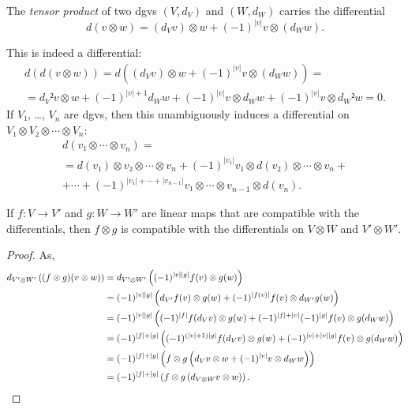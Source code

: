 \documentclass[english,no-theorem-numbers]{short-notes}
\newcommand\degree[1]{|#1|}
\newenvironment{verification}{\footnotesize\color{gray}}{}
\begin{document}
\begin{Def}
The \emph{tensor product} of two dgvs $(V,d_V)$ and $(W,d_W)$ carries the differential
\[
d(v\otimes w) = (d_V v) \otimes w + (-1)^{\degree v} v \otimes (d_W w).
\]
\end{Def}
\begin{verification}
    This is indeed a differential:
    \begin{multline*}
    d(d(v\otimes w)) =
    d\left((d_V v) \otimes w + (-1)^{\degree v} v \otimes (d_W w)\right)  =\\=
    d_V²v \otimes w + (-1)^{\degree v + 1} d_Ww + (-1)^{\degree v} v \otimes d_W w + (-1)^{\degree v} v \otimes d_W² w =
    0.
    \end{multline*}%
\end{verification}%
If $V₁$, \dots, $V_n$ are dgvs, then this unambiguously induces a differential on $V₁ \otimes V₂ \otimes \dotsb \otimes V_n$:
\begin{multline*}
d(v₁ \otimes \dotsb \otimes v_n) = \\ =
d(v₁) \otimes v₂ \otimes \dotsb \otimes v_n + (-1)^{\degree{v₁}} v₁ \otimes d(v₂) \otimes \dotsb \otimes v_n + \\ + \dotsb + (-1)^{\degree{v₁} + \dotsb + \degree{v_{n-1}}} v₁ \otimes \dotsb \otimes v_{n-1} \otimes d(v_n).
\end{multline*}

\begin{Prop}
    If $f\colon V → V'$ and $g\colon W → W'$ are linear maps that are compatible with the differentials, then $f \otimes g$ is compatible with the differentials on $V\otimes W$ and $V' \otimes W'$.
\end{Prop}
\begin{proof}
    As,
    \begin{align*}
    d_{V'\otimes W'}\left( (f\otimes g)(v \otimes w) \right)  & =
    d_{V'\otimes W'}\left( (-1)^{\degree v \degree g}f(v) \otimes g(w) \right) \\ & =
    (-1)^{\degree v \degree g} \left( d_{V'}f(v) \otimes g(w) + (-1)^{\degree{f(v)}} f(v) \otimes d_{W'} g(w) \right)\\ &  = 
    (-1)^{\degree v \degree g} \left( (-1)^{\degree f}f(d_Vv) \otimes g(w) + (-1)^{\degree{f} + \degree{v}}(-1)^{\degree g} f(v) \otimes g(d_Ww) \right)\\ &  = 
    (-1)^{\degree f + \degree g} \left( (-1)^{(\degree v + 1)\degree g} f(d_Vv) \otimes g(w) + (-1)^{\degree v + \degree v \degree g} f(v) \otimes g(d_Ww) \right)\\ &  =
    (-1)^{\degree f + \degree g} \left( f\otimes g \left( d_Vv \otimes w + (-1)^{\degree v} v \otimes d_Ww \right) \right)\\ &  =
    (-1)^{\degree f + \degree g} \left( f\otimes g \left( d_{V\otimes W} v \otimes w \right) \right).
    \qedhere
    \end{align*}%
\end{proof}
\end{document}
